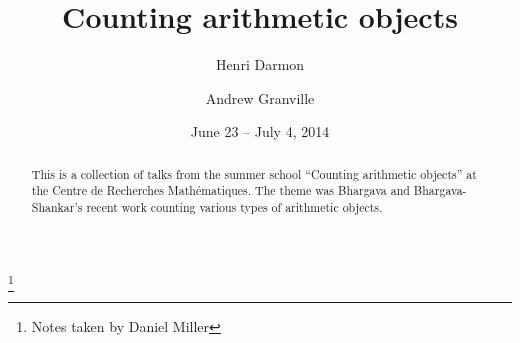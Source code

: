 \documentclass[english,letterpaper]{smfart}
\author{Henri Darmon}
\author{Andrew Granville}
\title{Counting arithmetic objects}
\date{June 23 -- July 4, 2014}
\begin{document}
\frontmatter

\begin{abstract}
This is a collection of talks from the summer school ``Counting arithmetic 
objects'' at the Centre de Recherches Math\'ematiques. The theme was Bhargava 
and Bhargava-Shankar's recent work counting various types of arithmetic 
objects.  
\end{abstract}

\thanks{Notes taken by Daniel Miller}

\maketitle
\tableofcontents
\mainmatter























\backmatter


\end{document}
